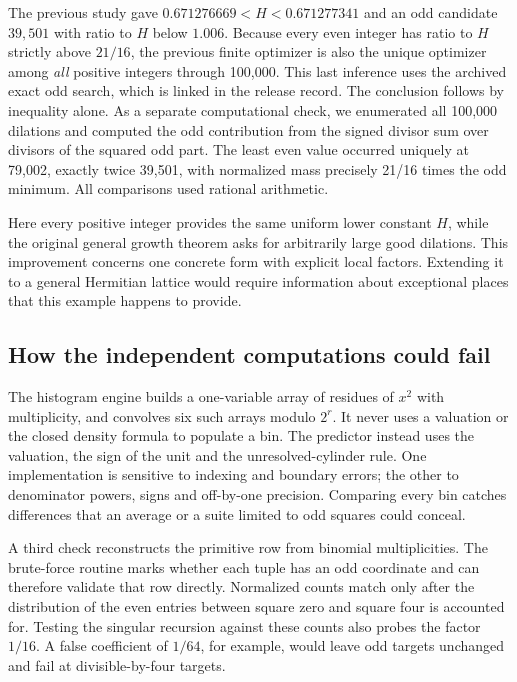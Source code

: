 \documentclass[12pt,letterpaper]{article}
\begin{document}
The previous study gave \(0.671276669<H<0.671277341\) and an odd candidate \(39{,}501\) with ratio to \(H\) below \(1.006\). Because every even integer has ratio to \(H\) strictly above \(21/16\), the previous finite optimizer is also the unique optimizer among \emph{all} positive integers through 100,000. This last inference uses the archived exact odd search, which is linked in the release record. The conclusion follows by inequality alone. As a separate computational check, we enumerated all 100,000 dilations and computed the odd contribution from the signed divisor sum over divisors of the squared odd part. The least even value occurred uniquely at 79,002, exactly twice 39,501, with normalized mass precisely 21/16 times the odd minimum. All comparisons used rational arithmetic.

Here every positive integer provides the same uniform lower constant \(H\), while the original general growth theorem asks for arbitrarily large good dilations. This improvement concerns one concrete form with explicit local factors. Extending it to a general Hermitian lattice would require information about exceptional places that this example happens to provide.

\clearpage\subsection{How the independent computations could fail}
The histogram engine builds a one-variable array of residues of \(x^2\) with multiplicity, and convolves six such arrays modulo \(2^r\). It never uses a valuation or the closed density formula to populate a bin. The predictor instead uses the valuation, the sign of the unit and the unresolved-cylinder rule. One implementation is sensitive to indexing and boundary errors; the other to denominator powers, signs and off-by-one precision. Comparing every bin catches differences that an average or a suite limited to odd squares could conceal.

A third check reconstructs the primitive row from binomial multiplicities. The brute-force routine marks whether each tuple has an odd coordinate and can therefore validate that row directly. Normalized counts match only after the distribution of the even entries between square zero and square four is accounted for. Testing the singular recursion against these counts also probes the factor \(1/16\). A false coefficient of \(1/64\), for example, would leave odd targets unchanged and fail at divisible-by-four targets.
\end{document}
